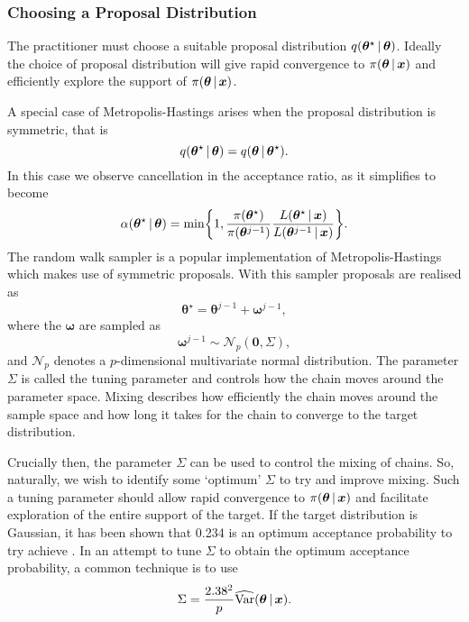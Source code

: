 \subsubsection{Choosing a Proposal Distribution}
\label{ssec:proposal_distribution}

The practitioner must choose a suitable proposal distribution $q(\bm{\theta}^\star \,|\,
\bm{\theta})$. Ideally the choice of proposal distribution will give rapid convergence to
$\pi(\bm{\theta} \,|\, \bm{x})$ and efficiently explore the support of $\pi(\bm{\theta}
\,|\, \bm{x})$.

A special case of Metropolis-Hastings arises when the proposal distribution is symmetric,
that is
\begin{equation*}
	q(\bm{\theta}^\star \,|\, \bm{\theta}) = q(\bm{\theta} \,|\, \bm{\theta}^\star).
\end{equation*}
In this case we observe cancellation in the acceptance ratio, as it simplifies to become
\begin{equation*}
	\alpha({\bm{\theta}}^\star \,|\, \bm{\theta}) = \text{min}\bigg\{ 1,
	\frac{\pi({\bm{\theta}}^\star)}{\pi({\bm{\theta}}^{j-1})} \frac{L(\bm{\theta}^\star \,|\,
		\bm{x})}{L({\bm{\theta}}^{j-1} \,|\, \bm{x})} \bigg\}.
\end{equation*}
The random walk sampler is a popular implementation of Metropolis-Hastings which makes
use of symmetric proposals. With this sampler proposals are realised as
\begin{equation*}
	\bm{\theta}^\star = \bm{\theta}^{j-1} + \bm{\omega}^{j-1},
\end{equation*}
where the $\bm{\omega}$ are sampled as 
\begin{equation*}
	\bm{\omega}^{j-1} \sim \mathcal{N}_p(\bm{0}, \Sigma),
\end{equation*}
and $\mathcal{N}_p$ denotes a $p$-dimensional multivariate normal distribution. The
parameter $\Sigma$ is called the tuning parameter and controls how the chain moves around
the parameter space. Mixing describes how efficiently the chain moves around the sample
space and how long it takes for the chain to converge to the target distribution.

Crucially then, the parameter $\Sigma$ can be used to control the mixing of chains. So,
naturally, we wish to identify some `optimum' $\Sigma$ to try and improve mixing. Such a
tuning parameter should allow rapid convergence to $\pi(\bm{\theta} \,|\, \bm{x})$ and
facilitate exploration of the entire support of the target. If the target distribution is
Gaussian, it has been shown that 0.234 is an optimum acceptance probability to try achieve
\parencite{roberts01}. In an attempt to tune $\Sigma$ to obtain the optimum acceptance
probability, a common technique is to use
\begin{equation*}
    \Sigma = \frac{2.38^2}{p} \widehat{\text{Var}}(\bm{\theta} \,|\, \bm{x}).
\end{equation*}


